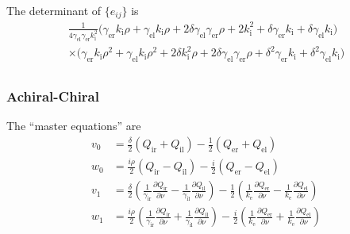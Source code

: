 The determinant of $\{e_{ij}\}$ is
\begin{multline*}
  \frac{1}{4 \gamma_\text{el} \gamma_\text{er} k_\text{i}^2}\bigl(\gamma_\text{er} k_\text{i} \rho+\gamma_\text{el} k_\text{i} \rho+2 \delta \gamma_\text{el} \gamma_\text{er} \rho+2 k_\text{i}^2+\delta \gamma_\text{er} k_\text{i}+\delta \gamma_\text{el} k_\text{i}\bigr)\\
\times\bigl(\gamma_\text{er} k_\text{i} \rho^2+\gamma_\text{el} k_\text{i} \rho^2+2 \delta k_\text{i}^2 \rho+2 \delta \gamma_\text{el} \gamma_\text{er} \rho+\delta^2 \gamma_\text{er} k_\text{i}+\delta^2 \gamma_\text{el} k_\text{i}\bigr) \\
\end{multline*}

\subsubsection{Achiral-Chiral}

The ``master equations'' are 
\begin{align*}
  v_0 &= \frac{\delta}{2}(Q_\text{ir} + Q_\text{il}) - \frac{1}{2}(Q_\text{er} + Q_\text{el}) \\
  w_0 &= \frac{i\rho}{2}(Q_\text{ir} - Q_\text{il}) -\frac{i}{2}(Q_\text{er} - Q_\text{el}) \\
  v_1 &=\frac{\delta}{2}\left(\frac{1}{\gamma_\text{ir}}\frac{\partial Q_\text{ir}}{\partial\nu} - \frac{1}{\gamma_\text{il}}\frac{\partial Q_\text{il}}{\partial\nu}\right) -\frac{1}{2}\left(\frac{1}{k_\text{e}}\frac{\partial Q_\text{er}}{\partial\nu} - \frac{1}{k_\text{e}}\frac{\partial Q_\text{el}}{\partial\nu}\right) \\
  w_1 &=\frac{i\rho}{2}\left(\frac{1}{\gamma_\text{ir}}\frac{\partial Q_\text{ir}}{\partial\nu} + \frac{1}{\gamma_\text{il}}\frac{\partial Q_\text{il}}{\partial\nu}\right) -\frac{i}{2}\left(\frac{1}{k_\text{e}}\frac{\partial Q_\text{er}}{\partial\nu} + \frac{1}{k_\text{e}}\frac{\partial Q_\text{el}}{\partial\nu}\right) \\
\end{align*}


